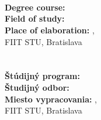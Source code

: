 \begin{center}
\newpage
\thispagestyle{empty}

\ifenglish
	{\Large \bf \Uni}\\[\baselineskip]
	{\large \Faculty}
\else
	{\Large \bf \Unisk}\\[\baselineskip]
	{\large \Facultysk}
\fi


\noindent\makebox[\linewidth]{\rule{\textwidth}{1pt}} 


\hspace{0.5cm}

{\large \bf \FIIT}\\
\vspace*{4.5cm}
{\Large \Author}\\[\baselineskip]
\ifenglish
	{\huge \bf \Title}\\[\baselineskip]
	{\large \Thesis}\\
\else
	{\huge \bf \Titlesk}\\[\baselineskip]
	{\large \Thesissk}\\
\fi

\end{center}
\vspace{4.9cm}
\ifenglish
	{\bf Degree course:} \hspace*{1.4cm} \Program\\ 
	{\bf Field of study:}  \hspace*{1.6cm}\Field\\
	{\bf Place of elaboration:}  \hspace*{.5cm}\Place,\\ 
	\hspace*{4.4cm}FIIT STU, Bratislava \\
	{\bf \Superv}  \hspace*{2cm} \Supervisor \\ \\
	\Month    \Year
\else
	{\bf Štúdijný program:}  \hspace*{0.6cm} \Programsk\\ 
	{\bf Študijný odbor:}  \hspace*{1.1cm} \Fieldsk\\
	{\bf Miesto vypracovania:}  \hspace*{0.1cm} \Placesk,\\
	\hspace*{4.2cm}FIIT STU, Bratislava \\
	{\bf \Supervsk}  \hspace*{1.5cm} \Supervisor \\ \\
	\Monthsk    \Year
\fi
